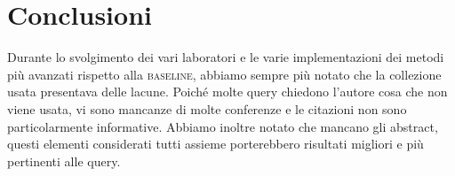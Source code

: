 \documentclass{llncs}
\begin{document}






\section{Conclusioni}
\label{sec:conclusioni}

Durante lo svolgimento dei vari laboratori e le varie implementazioni dei metodi pi\`u avanzati rispetto alla \textsc{baseline}, abbiamo sempre pi\`u notato che la collezione usata presentava delle lacune. Poich\'e molte query chiedono l'autore cosa che non viene usata, vi sono mancanze di molte conferenze e le citazioni non sono particolarmente informative. Abbiamo inoltre notato che mancano gli abstract, questi elementi considerati tutti assieme porterebbero risultati migliori e pi\`u pertinenti alle query.




\end{document}

